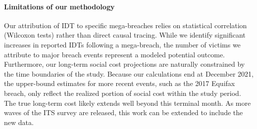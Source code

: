 \paragraph{Limitations of our methodology}
Our attribution of IDT to specific mega-breaches relies on statistical correlation (Wilcoxon tests) rather than direct causal tracing. While we identify significant increases in reported IDTs following a mega-breach, the number of victims we attribute to major  breach events represent a modeled potential outcome.
Furthermore, our long-term social cost projections are naturally constrained by the time boundaries of the study. Because our calculations end at December 2021, the upper-bound estimates for more recent events, such as the 2017 Equifax breach, only reflect the realized portion of social cost within the study period. The true long-term cost likely extends well beyond this terminal month. As more waves of the ITS survey are released, this work can be extended to include the new data. 


